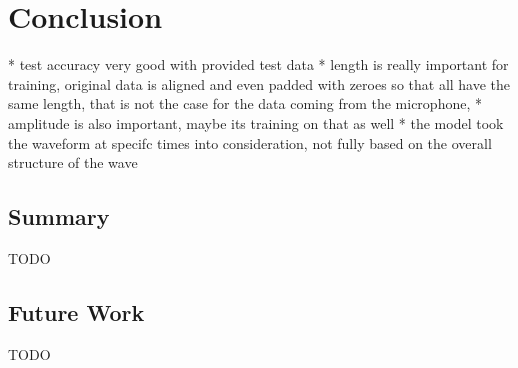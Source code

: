 \chapter{Conclusion}
* test accuracy very good with provided test data
* length is really important for training, original data is aligned and even padded with zeroes so that all have the same length,
that is not the case for the data coming from the microphone, 
* amplitude is also important, maybe its training on that as well
* the model took the waveform at specifc times into consideration, not fully based on the overall structure of the wave

\section{Summary}
TODO

\section{Future Work}
TODO